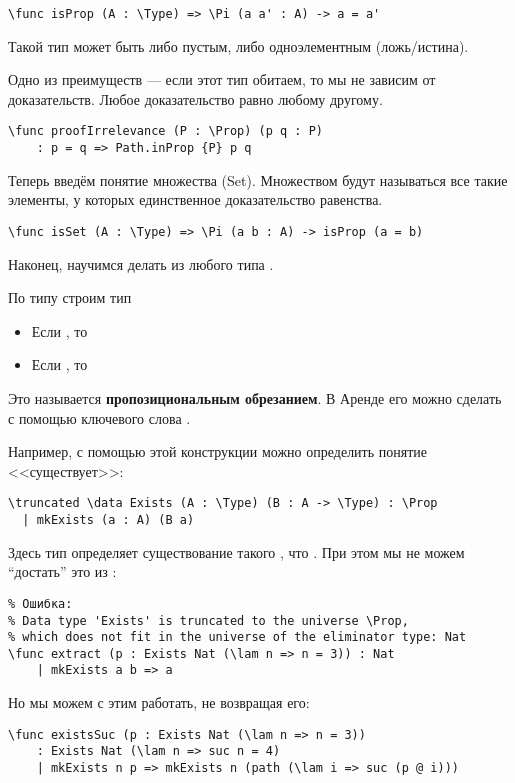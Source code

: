 \begin{verbatim}
\func isProp (A : \Type) => \Pi (a a' : A) -> a = a'
\end{verbatim}

Такой тип может быть либо пустым, либо одноэлементным (ложь/истина).

Одно из преимуществ  --- если этот тип обитаем, то мы не зависим от доказательств. Любое доказательство равно любому другому.
\begin{verbatim}
\func proofIrrelevance (P : \Prop) (p q : P)
    : p = q => Path.inProp {P} p q
\end{verbatim}

Теперь введём понятие множества (Set). Множеством будут называться все такие элементы, у которых единственное доказательство равенства.

\begin{verbatim}
\func isSet (A : \Type) => \Pi (a b : A) -> isProp (a = b)
\end{verbatim}

Наконец, научимся делать из любого типа .

По типу  строим тип 
\begin{itemize}
    \item Если , то 
    \item Если , то 
\end{itemize}
Это называется \textbf{пропозициональным обрезанием}. В Аренде его можно сделать с помощью ключевого слова \ard{\truncated}.

Например, с помощью этой конструкции можно определить понятие <<существует>>:
\begin{verbatim}
\truncated \data Exists (A : \Type) (B : A -> \Type) : \Prop
  | mkExists (a : A) (B a)
\end{verbatim}

Здесь тип  определяет существование такого , что . При этом мы не можем ``достать'' это  из :
\begin{verbatim}
% Ошибка:
% Data type 'Exists' is truncated to the universe \Prop,
% which does not fit in the universe of the eliminator type: Nat
\func extract (p : Exists Nat (\lam n => n = 3)) : Nat
    | mkExists a b => a
\end{verbatim}

Но мы можем с этим  работать, не возвращая его:
\begin{verbatim}
\func existsSuc (p : Exists Nat (\lam n => n = 3))
    : Exists Nat (\lam n => suc n = 4)
    | mkExists n p => mkExists n (path (\lam i => suc (p @ i)))
\end{verbatim}

